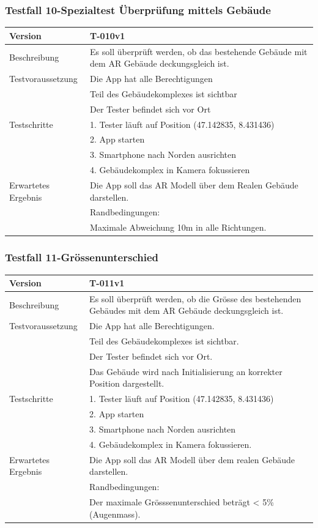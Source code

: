 \documentclass[a4paper]{scrreprt}
\begin{document}
\subsubsection{Testfall 10-Spezialtest Überprüfung mittels Gebäude}
\begin{tabularx}{\textwidth}{|l|X|}
\hline
	Version &
	T-010v1 \\ 
\hline 
	Beschreibung & 
	Es soll überprüft werden, ob das bestehende Gebäude mit dem AR Gebäude deckungsgleich ist. \\ 
\hline 
	Testvoraussetzung &
	Die App hat alle Berechtigungen\\ &
	Teil des Gebäudekomplexes ist sichtbar\\ &
	Der Tester befindet sich vor Ort\\ 
\hline 
	Testschritte & 
		1. Tester läuft auf Position (47.142835, 8.431436)\\ &
		2. App starten\\ &
		3. Smartphone nach Norden ausrichten\\ &
		4. Gebäudekomplex in Kamera fokussieren\\
\hline
	Erwartetes Ergebnis &
	Die App soll das AR Modell über dem Realen Gebäude darstellen. \\ &
	Randbedingungen: \\ &
		Maximale Abweichung 10m in alle Richtungen.\\
\hline
\end{tabularx}
\subsubsection{Testfall 11-Grössenunterschied}
\begin{tabularx}{\textwidth}{|l|X|}
\hline 
	Version &
	T-011v1 \\ 
\hline 
	Beschreibung & 
	Es soll überprüft werden, ob die Grösse des bestehenden Gebäudes mit dem AR Gebäude deckungsgleich ist. \\ 
\hline
    Testvoraussetzung &
	Die App hat alle Berechtigungen.\\ &
	Teil des Gebäudekomplexes ist sichtbar.\\ &
	Der Tester befindet sich vor Ort. \\ &
	Das Gebäude wird nach Initialisierung an korrekter Position dargestellt. \\
\hline 
	Testschritte & 
		1. Tester läuft auf Position (47.142835, 8.431436)\\ &
		2. App starten\\ &
		3. Smartphone nach Norden ausrichten\\ &
		4. Gebäudekomplex in Kamera fokussieren. \\
\hline
	Erwartetes Ergebnis &
	Die App soll das AR Modell über dem realen Gebäude darstellen. \\ &
	Randbedingungen: \\ &
		Der maximale Grösssenunterschied beträgt < 5\% (Augenmass). \\ 
\hline 
\end{tabularx}
\end{document}
